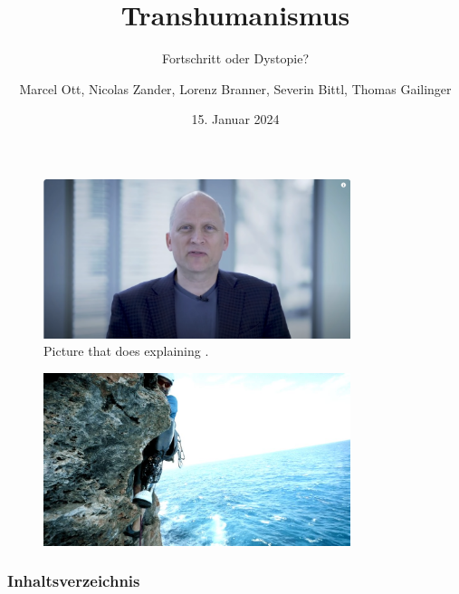 \documentclass[aspectratio=169,16pt,xcolor=table]{beamer}
\date{15. Januar 2024}
\begin{document}
\begin{frame}
  \begin{figure}[h!]
    \centering   
	\includegraphics[width=0.8\textwidth]{pictures/Video_Vorschau.png}
    \caption{
        Picture that does explaining \cite{Merzlyakov2022}.
    }
    \label{fig:basics AFM sketch}
  \end{figure}
\end{frame}

\begin{frame}
  \begin{figure}[h!]
    \centering   
	\includegraphics[width=0.8\textwidth]{pictures/AMI_Klettern.png}
  \end{figure}
\end{frame}

\title{Transhumanismus}
\subtitle{Fortschritt oder Dystopie?}
\author{Marcel Ott, Nicolas Zander, Lorenz Branner, Severin Bittl, Thomas Gailinger}

\maketitle

\begin{frame}[allowframebreaks]
	\frametitle{Inhaltsverzeichnis}
	\tableofcontents
\end{frame}
\end{document}
